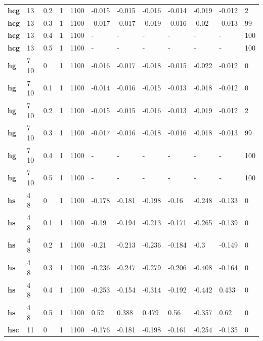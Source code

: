 \begin{longtable}[h]{|p{0.8cm}|p{1.5cm}|p{1cm}|p{1cm}|p{1cm}|p{1cm}|p{1cm}|p{1cm}|p{1cm}|p{1cm}|p{1cm}|p{1.5cm}|}
           \\
  \textbf{hcg } &  13         & 0.2 & 1 & 1100 & -0.015 & -0.015 & -0.016 & -0.014 & -0.019 & -0.012 &   2
           \\
  \textbf{hcg } &  13         & 0.3 & 1 & 1100 & -0.017 & -0.017 & -0.019 & -0.016 &  -0.02 & -0.013 &  99
           \\
  \textbf{hcg } &  13         & 0.4 & 1 & 1100 & - & - & - & - & - & - & 100
           \\
  \textbf{hcg } &  13         & 0.5 & 1 & 1100 & - & - & - & - & - & - & 100
           \\
  \textbf{hg  } &  7 10       &   0 & 1 & 1100 & -0.016 & -0.017 & -0.018 & -0.015 & -0.022 & -0.012 &   0
           \\
  \textbf{hg  } &  7 10       & 0.1 & 1 & 1100 & -0.014 & -0.016 & -0.015 & -0.013 & -0.018 & -0.012 &   0
           \\
  \textbf{hg  } &  7 10       & 0.2 & 1 & 1100 & -0.015 & -0.015 & -0.016 & -0.013 & -0.019 & -0.012 &   2
           \\
  \textbf{hg  } &  7 10       & 0.3 & 1 & 1100 & -0.017 & -0.016 & -0.018 & -0.016 & -0.018 & -0.013 &  99
           \\
  \textbf{hg  } &  7 10       & 0.4 & 1 & 1100 & - & - & - & - & - & - & 100
           \\
  \textbf{hg  } &  7 10       & 0.5 & 1 & 1100 & - & - & - & - & - & - & 100
           \\
  \textbf{hs  } &  4 8        &   0 & 1 & 1100 & -0.178 & -0.181 & -0.198 &  -0.16 & -0.248 & -0.133 &   0
           \\
  \textbf{hs  } &  4 8        & 0.1 & 1 & 1100 &  -0.19 & -0.194 & -0.213 & -0.171 & -0.265 & -0.139 &   0
           \\
  \textbf{hs  } &  4 8        & 0.2 & 1 & 1100 &  -0.21 & -0.213 & -0.236 & -0.184 &   -0.3 & -0.149 &   0
           \\
  \textbf{hs  } &  4 8        & 0.3 & 1 & 1100 & -0.236 & -0.247 & -0.279 & -0.206 & -0.408 & -0.164 &   0
           \\
  \textbf{hs  } &  4 8        & 0.4 & 1 & 1100 & -0.253 & -0.154 & -0.314 & -0.192 & -0.442 &  0.433 &   0
           \\
  \textbf{hs  } &  4 8        & 0.5 & 1 & 1100 &   0.52 &  0.388 &  0.479 &   0.56 & -0.357 &   0.62 &   0
           \\
  \textbf{hsc } &  11         &   0 & 1 & 1100 & -0.176 & -0.181 & -0.198 & -0.161 & -0.254 & -0.135 &   0

\end{longtable}
